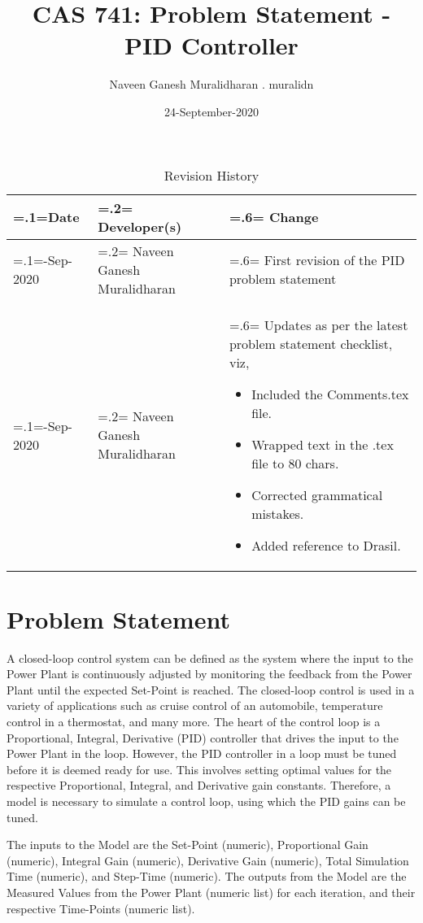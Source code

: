 \documentclass{article}
\title{CAS 741: Problem Statement - \\PID Controller}
\author{Naveen Ganesh Muralidharan . muralidn}
\date{24-September-2020}
\begin{document}
\maketitle

\begin{table}[hp]
\caption{Revision History} \label{TblRevisionHistory}
\begin{tabularx}{\textwidth}{>{\hsize=.1\hsize\linewidth=\hsize}X
>{\hsize=.2\hsize\linewidth=\hsize}X
>{\hsize=.6\hsize\linewidth=\hsize}X}
\toprule
\textbf{Date} & \textbf{Developer(s)} & \textbf{Change}\\
\midrule
21-Sep-2020 & Naveen Ganesh Muralidharan & First revision of the PID problem 
statement\\
24-Sep-2020 & Naveen Ganesh Muralidharan & Updates as per the latest problem
statement checklist, viz,
\begin{itemize}
\item Included the Comments.tex file. 
\item Wrapped text in the .tex file to 80 chars. 
\item Corrected grammatical mistakes.
\item Added reference to Drasil.
\end{itemize}\\
\bottomrule
\end{tabularx}
\end{table}

\section*{Problem Statement}

A closed-loop control system can be defined as the system where the input to the 
Power Plant is continuously adjusted by monitoring the feedback from the Power 
Plant until the expected Set-Point is reached. The closed-loop control is used 
in a variety of applications such as cruise control of an automobile, 
temperature control in a thermostat, and many more. The heart of the control 
loop is a Proportional, Integral, Derivative (PID) controller that drives the 
input to the Power Plant in the loop. However, the PID controller in a loop must 
be tuned before it is deemed ready for use. This involves setting optimal values 
for the respective Proportional, Integral, and Derivative gain constants. 
Therefore, a model is necessary to simulate a control loop, using which the 
PID gains can be tuned.

The inputs to the Model are the Set-Point (numeric), Proportional Gain 
(numeric), Integral Gain (numeric), Derivative Gain (numeric), Total 
Simulation Time (numeric), and Step-Time (numeric). The outputs from the Model 
are the Measured Values from the Power Plant (numeric list) for each iteration, 
and their respective Time-Points (numeric list).
\end{document}
